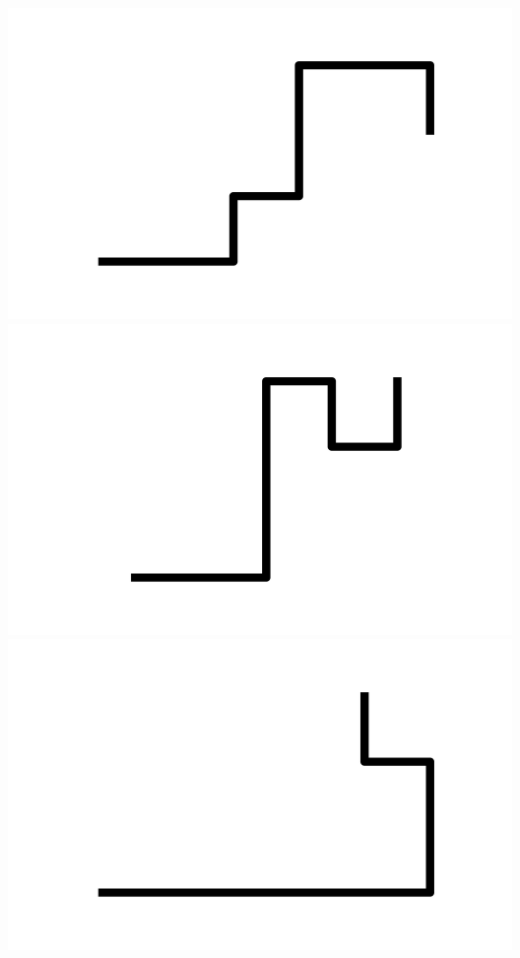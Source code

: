 \documentclass[]{report}
\begin{document}
\includegraphics[scale=.1]{pictures/21/state_cluster_shapes_451.pdf} 
\includegraphics[scale=.1]{pictures/21/state_cluster_shapes_452.pdf} 
\includegraphics[scale=.1]{pictures/21/state_cluster_shapes_453.pdf} 
\end{document}
